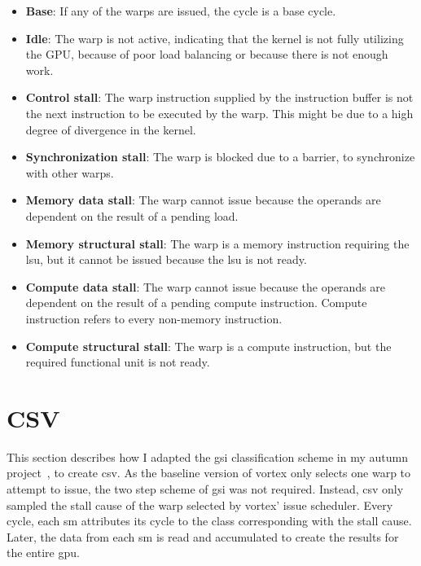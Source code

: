 \begin{itemize}
    \item \textbf{Base}: If any of the warps are issued, the cycle is a base cycle.
    \item \textbf{Idle}: The warp is not active, indicating that the kernel is not fully utilizing the GPU, because of poor load balancing or because there is not enough work.
    \item \textbf{Control stall}: The warp instruction supplied by the instruction buffer is not the next instruction to be executed by the warp. This might be due to a high degree of divergence in the kernel.
    \item \textbf{Synchronization stall}: The warp is blocked due to a barrier, to synchronize with other warps.
    \item \textbf{Memory data stall}: The warp cannot issue because the operands are dependent on the result of a pending load.
    \item \textbf{Memory structural stall}: The warp is a memory instruction requiring the \acrshort{lsu}, but it cannot be issued because the \acrshort{lsu} is not ready.
    \item \textbf{Compute data stall}: The warp cannot issue because the operands are dependent on the result of a pending compute instruction. Compute instruction refers to every non-memory instruction. 
    \item \textbf{Compute structural stall}: The warp is a compute instruction, but the required functional unit is not ready.
\end{itemize}


\section{CSV} \label{sec:csv}

This section describes how I adapted the \acrshort{gsi} classification scheme in my autumn project~\cite{Aurud_Project}, to create \acrshort{csv}. As the baseline version of \Gls{vortex} only selects one warp to attempt to issue, the two step scheme of \acrshort{gsi} was not required. Instead, \acrshort{csv} only sampled the stall cause of the warp selected by \Gls{vortex}' issue scheduler. Every cycle, each \acrshort{sm} attributes its cycle to the class corresponding with the stall cause. Later, the data from each \acrshort{sm} is read and accumulated to create the results for the entire \acrshort{gpu}.

